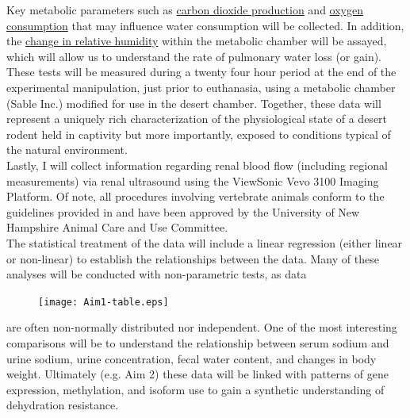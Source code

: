 \documentclass[11pt]{article}
\begin{document}
Key metabolic parameters such as \ul{carbon dioxide production} and \ul{oxygen consumption} that may influence water consumption will be collected. In addition, the \ul{change in relative humidity} within the metabolic chamber will be assayed, which will allow us to understand the rate of pulmonary water loss (or gain). These tests will be measured during a twenty four hour period at the end of the experimental manipulation, just prior to euthanasia, using a metabolic chamber (Sable Inc.) modified for use in the desert chamber. Together, these data will represent a uniquely rich characterization of the physiological state of a desert rodent held in captivity but more importantly, exposed to conditions typical of the natural environment. \\

Lastly, I will collect information regarding renal blood flow (including regional measurements) via renal ultrasound using the ViewSonic Vevo 3100 Imaging Platform. Of note, all procedures involving vertebrate animals conform to the guidelines provided in \citep{Sikes:2011dz} and have been approved by the University of New Hampshire Animal Care and Use Committee. \\


The statistical treatment of the data will include a linear regression (either linear or non-linear) to establish the relationships between the data. Many of these analyses will be conducted with non-parametric tests, as data 

\begin{figure}
\hypertarget{Table 1}{}
\vspace{-5mm}
\begin{mdframed}
  \begin{center}
    \texttt{[image: Aim1-table.eps]}
  \end{center}
\end{mdframed}
\end{figure}

\noindent are often non-normally distributed nor independent. One of the most interesting comparisons will be to understand the relationship between serum sodium and urine sodium, urine concentration, fecal water content, and changes in body weight. Ultimately (e.g. Aim 2) these data will be linked with patterns of gene expression, methylation, and isoform use to gain a synthetic understanding of dehydration resistance. \\
\end{document}
